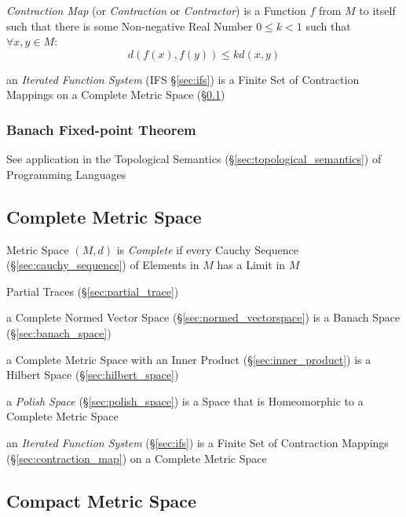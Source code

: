 \emph{Contraction Map} (or \emph{Contraction} or \emph{Contractor}) is a
Function $f$ from $M$ to itself such that there is some Non-negative Real Number
$0 \leq k < 1$ such that $\forall x,y \in M$:
\[
  d(f(x),f(y)) \leq k d(x,y)
\]

\fist an \emph{Iterated Function System} (IFS \S\ref{sec:ifs}) is a Finite Set
of Contraction Mappings on a Complete Metric Space
(\S\ref{sec:complete_metric_space})



\subsubsection{Banach Fixed-point Theorem}\label{sec:banach_fixedpoint}

\fist See application in the Topological Semantics
(\S\ref{sec:topological_semantics}) of Programming Languages



\subsection{Complete Metric Space}\label{sec:complete_metric_space}

Metric Space $(M,d)$ is \emph{Complete} if every Cauchy Sequence
(\S\ref{sec:cauchy_sequence}) of Elements in $M$ has a Limit in $M$

Partial Traces (\S\ref{sec:partial_trace})

a Complete Normed Vector Space (\S\ref{sec:normed_vectorspace}) is a Banach
Space (\S\ref{sec:banach_space})

a Complete Metric Space with an Inner Product (\S\ref{sec:inner_product}) is a
Hilbert Space (\S\ref{sec:hilbert_space})

a \emph{Polish Space} (\S\ref{sec:polish_space}) is a Space that is Homeomorphic
to a Complete Metric Space

\fist an \emph{Iterated Function System} (\S\ref{sec:ifs}) is a Finite Set of
Contraction Mappings (\S\ref{sec:contraction_map}) on a Complete Metric Space



\subsection{Compact Metric Space}\label{sec:compact_metric_space}

